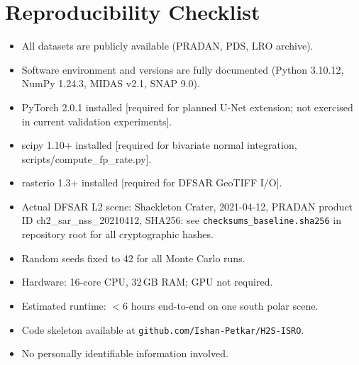 \documentclass[10pt,conference]{IEEEtran}
\begin{document}
\section*{Reproducibility Checklist}

\begin{itemize}
  \item[\checkmark] All datasets are publicly available (PRADAN, PDS,
    LRO archive).
  \item[\checkmark] Software environment and versions are fully documented
    (Python 3.10.12, NumPy 1.24.3, MIDAS v2.1, SNAP 9.0).
  \item[\checkmark] PyTorch 2.0.1 installed [required for planned U-Net extension; 
    not exercised in current validation experiments].
  \item[\checkmark] scipy 1.10+ installed [required for bivariate normal integration, 
    scripts/compute\_fp\_rate.py].
  \item[\checkmark] rasterio 1.3+ installed [required for DFSAR GeoTIFF I/O].
  \item[\checkmark] Actual DFSAR L2 scene: Shackleton Crater, 2021-04-12, PRADAN 
    product ID ch2\_sar\_nss\_20210412, SHA256: see \texttt{checksums\_baseline.sha256} in repository root for all cryptographic hashes.
  \item[\checkmark] Random seeds fixed to 42 for all Monte Carlo runs.
  \item[\checkmark] Hardware: 16-core CPU, 32\,GB RAM; GPU not required.
  \item[\checkmark] Estimated runtime: $<$6 hours end-to-end on
    one south polar scene.
  \item[\checkmark] Code skeleton available at
    \texttt{github.com/Ishan-Petkar/H2S-ISRO}.
  \item[\checkmark] No personally identifiable information involved.
\end{itemize}
\end{document}
